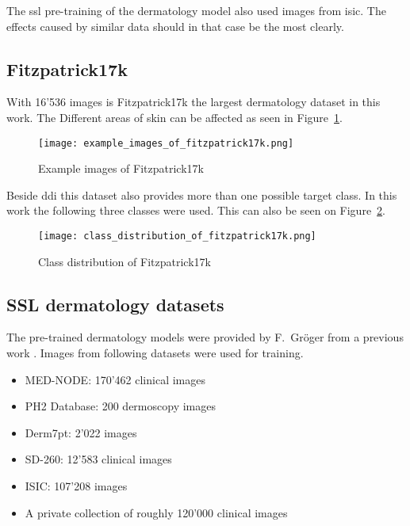 The \gls{ssl} pre-training of the dermatology model also used images from \gls{isic}. 
The effects caused by similar data should in that case be the most clearly.

\subsection{Fitzpatrick17k}
With 16'536 images is Fitzpatrick17k the largest dermatology dataset in this work. 
The Different areas of skin can be affected as seen in Figure~\ref{fig:example_images_of_fitzpatrick17k}.

\begin{figure}[H]
    \begin{center}
    \texttt{[image: example\_images\_of\_fitzpatrick17k.png]}
    \caption{Example images of Fitzpatrick17k}\label{fig:example_images_of_fitzpatrick17k}
    \end{center}
\end{figure}

Beside \gls{ddi} this dataset also provides more than one possible target class. 
In this work the following three classes were used. This can also be seen on Figure~\ref{fig:class_distribution_of_fitzpatrick17k}.

\begin{figure}[H]
    \begin{center}
    \texttt{[image: class\_distribution\_of\_fitzpatrick17k.png]}
    \caption{Class distribution of Fitzpatrick17k}\label{fig:class_distribution_of_fitzpatrick17k}
    \end{center}
\end{figure}

\subsection{SSL dermatology datasets}
The pre-trained dermatology models were provided by F.~Gröger from a previous work \autocite{groeger2023}. 
Images from following datasets were used for training.

\begin{itemize}
    \item MED-NODE: 170'462 clinical images \autocite{giotis2015}
    \item PH2 Database: 200 dermoscopy images \autocite{mendonca2013}
    \item Derm7pt: 2'022 images \autocite{kawahara2019}
    \item SD-260: 12'583 clinical images \autocite{sun2016}
    \item ISIC: 107'208 images \autocite{giotis2015}
    \item A private collection of roughly 120'000 clinical images 
\end{itemize}


